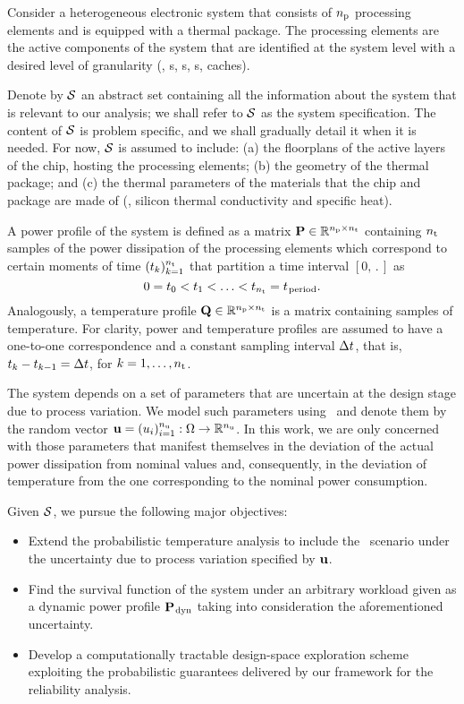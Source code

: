 Consider a heterogeneous electronic system that consists of ${n_\text{p}}$ processing elements and is equipped with a thermal package.
The processing elements are the active components of the system that are identified at the system level with a desired level of granularity (\eg, s, s, s, caches).

Denote by $\mathcal{S}$ an abstract set containing all the information about the system that is relevant to our analysis; we shall refer to $\mathcal{S}$ as the system specification.
The content of $\mathcal{S}$ is problem specific, and we shall gradually detail it when it is needed.
For now, $\mathcal{S}$ is assumed to include: (a) the floorplans of the active layers of the chip, hosting the processing elements; (b) the geometry of the thermal package; and (c) the thermal parameters of the materials that the chip and package are made of (\eg, silicon thermal conductivity and specific heat).

A power profile of the system is defined as a matrix $\mathbf{P} \in \mathbb{R}^{{n_\text{p}} \times {n_\text{t}}}$ containing ${n_\text{t}}$ samples of the power dissipation of the processing elements which correspond to certain moments of time $(t_k)_{k = 1}^{n_\text{t}}$ that partition a time interval $[0, \period]$ as
\[
  0 = t_0 < t_1 < \dotsc < t_{n_\text{t}} = t_{\text{\kern0.1emperiod}}.
\]
Analogously, a temperature profile $\mathbf{Q} \in \mathbb{R}^{{n_\text{p}} \times {n_\text{t}}}$ is a matrix containing samples of temperature.
For clarity, power and temperature profiles are assumed to have a one-to-one correspondence and a constant sampling interval $\Delta t$, that is, $t_k - t_{k - 1} = \Delta t$, for $k = 1, \dots, {n_\text{t}}$.

The system depends on a set of parameters that are uncertain at the design stage due to process variation.
We model such parameters using \rvs\ and denote them by the random vector $\mathbf{u} = (u_i)_{i = 1}^{n_\text{u}}: \Omega \to \mathbb{R}^{n_\text{u}}$.
In this work, we are only concerned with those parameters that manifest themselves in the deviation of the actual power dissipation from nominal values and, consequently, in the deviation of temperature from the one corresponding to the nominal power consumption.

Given $\mathcal{S}$, we pursue the following major objectives:
\begin{itemize}
  \item Extend the probabilistic temperature analysis to include the \DSS\ scenario under the uncertainty due to process variation specified by $\mathbf{u}$.
  \item Find the survival function of the system under an arbitrary workload given as a dynamic power profile $\mathbf{P}_{\text{\kern0.1emdyn}}$ taking into consideration the aforementioned uncertainty.
  \item Develop a computationally tractable design-space exploration scheme exploiting the probabilistic guarantees delivered by our framework for the reliability analysis.
\end{itemize}

